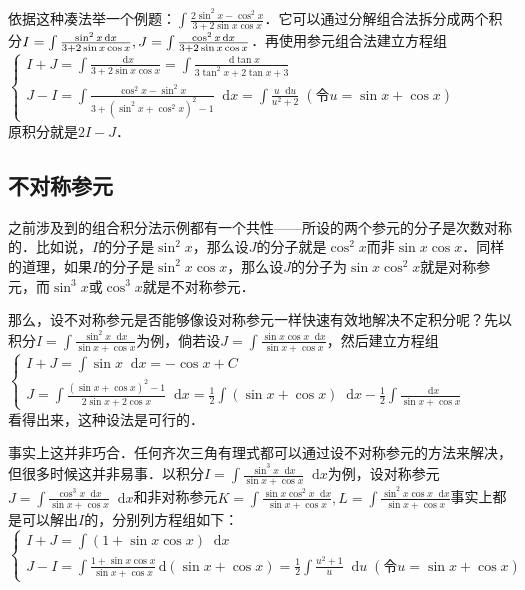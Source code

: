 \documentclass{ctexbook}
\newcommand*{\dif}{\mathop{}\!\mathrm{d}}
\begin{document}
依据这种凑法举一个例题：$\int\frac{2\sin^{2}{x}-\cos^{2}{x}}{3+2\sin{x}\cos{x}}$．它可以通过分解组合法拆分成两个积分$I=\int\frac{\sin^{2}{x}\dif{x}}{3+2\sin{x}\cos{x}},\\J=\int\frac{\cos^{2}{x}\dif{x}}{3+2\sin{x}\cos{x}}$．再使用参元组合法建立方程组\\
$\begin{cases}I+J=\int\frac{\dif{x}}{3+2\sin{x}\cos{x}}=\int\frac{\dif{\tan{x}}}{3\tan^{2}{x}+2\tan{x}+3}\\J-I=\int\frac{\cos^{2}{x}-\sin^{2}{x}}{3+\left(\sin^{2}{x}+\cos^{2}{x}\right)^{2}-1}\dif{x}=\int\frac{u\dif{u}}{u^{2}+2}\;\left(\text{令}u=\sin{x}+\cos{x}\right)\end{cases}$\\
原积分就是$2I-J$．\par
\subsection{不对称参元}
之前涉及到的组合积分法示例都有一个共性——所设的两个参元的分子是次数对称的．比如说，$I$的分子是$\sin^{2}{x}$，那么设$J$的分子就是$\cos^{2}{x}$而非$\sin{x}\cos{x}$．同样的道理，如果$I$的分子是$\sin^{2}{x}\cos{x}$，那么设$J$的分子为$\sin{x}\cos^{2}{x}$就是对称参元，而$\sin^{3}{x}$或$\cos^{3}{x}$就是不对称参元．\par
那么，设不对称参元是否能够像设对称参元一样快速有效地解决不定积分呢？先以积分$I=\int\frac{\sin^{2}{x}\dif{x}}{\sin{x}+\cos{x}}$为例，倘若设$J=\int\frac{\sin{x}\cos{x}\dif{x}}{\sin{x}+\cos{x}}$，然后建立方程组\\
$\begin{cases}I+J=\int\sin{x}\dif{x}=-\cos{x}+C\\J=\int\frac{\left(\sin{x}+\cos{x}\right)^{2}-1}{2\sin{x}+2\cos{x}}\dif{x}=\frac{1}{2}\int\left(\sin{x}+\cos{x}\right)\dif{x}-\frac{1}{2}\int\frac{\dif{x}}{\sin{x}+\cos{x}}\end{cases}$\\
看得出来，这种设法是可行的．\par
事实上这并非巧合．任何齐次三角有理式都可以通过设不对称参元的方法来解决，但很多时候这并非易事．以积分$I=\int\frac{\sin^{3}{x}\dif{x}}{\sin{x}+\cos{x}}\dif{x}$为例，设对称参元$J=\int\frac{\cos^{3}{x}\dif{x}}{\sin{x}+\cos{x}}\dif{x}$和非对称参元$K=\int\frac{\sin{x}\cos^{2}{x}\dif{x}}{\sin{x}+\cos{x}},L=\int\frac{\sin^{2}{x}\cos{x}\dif{x}}{\sin{x}+\cos{x}}$事实上都是可以解出$I$的，分别列方程组如下：\\
$\begin{cases}I+J=\int\left(1+\sin{x}\cos{x}\right)\dif{x}\\J-I=\int\frac{1+\sin{x}\cos{x}}{\sin{x}+\cos{x}}\,\mathrm{d}\left(\sin{x}+\cos{x}\right)=\frac{1}{2}\int\frac{u^{2}+1}{u}\dif{u}\;\left(\text{令}u=\sin{x}+\cos{x}\right)\end{cases}$\\
\end{document}
